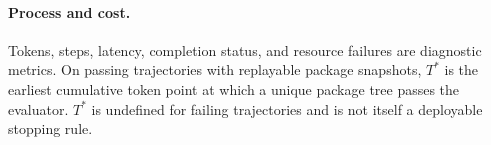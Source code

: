 \paragraph{Process and cost.}
Tokens, steps, latency, completion status, and resource failures are diagnostic
metrics. On passing trajectories with replayable package snapshots, $T^*$ is
the earliest cumulative token point at which a unique package tree passes the
evaluator. $T^*$ is undefined for failing trajectories and is not itself a
deployable stopping rule.
